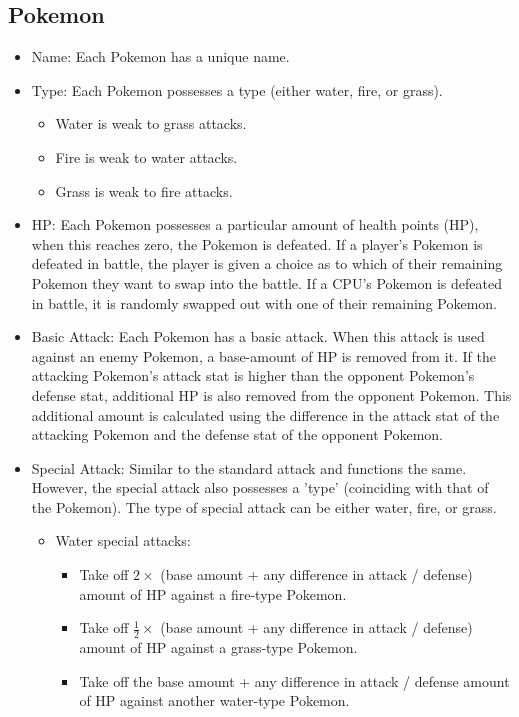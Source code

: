 \documentclass{article}
\begin{document}
  \subsection{Pokemon}
  \begin{itemize}
    \item Name: Each Pokemon has a unique name. 
    \item Type: Each Pokemon possesses a type (either water, fire, or grass).
      \begin{itemize}
        \item Water is weak to grass attacks. 
        \item Fire is weak to water attacks. 
        \item Grass is weak to fire attacks. 
      \end{itemize}
    \item HP: Each Pokemon possesses a particular amount of health points (HP), when this reaches zero, the Pokemon is defeated. If a player's Pokemon is defeated in battle, the player is given a choice as to which of their remaining Pokemon they want to swap into the battle. If a CPU's Pokemon is defeated in battle, it is randomly swapped out with one of their remaining Pokemon. 
    \item Basic Attack: Each Pokemon has a basic attack. When this attack is used against an enemy Pokemon, a base-amount of HP is removed from it. If the attacking Pokemon's attack stat is higher than the opponent Pokemon's defense stat, additional HP is also removed from the opponent Pokemon. This additional amount is calculated using the difference in the attack stat of the attacking Pokemon and the defense stat of the opponent Pokemon. 
    \item Special Attack: Similar to the standard attack and functions the same. However, the special attack also possesses a 'type' (coinciding with that of the Pokemon). The type of special attack can be either water, fire, or grass. 
      \begin{itemize}
        \item Water special attacks:
          \begin{itemize}
            \item Take off $2\times$ (base amount + any difference in attack / defense) amount of HP against a fire-type Pokemon.
            \item Take off $\frac{1}{2}\times{}$ (base amount + any difference in attack / defense) amount of HP against a grass-type Pokemon.
            \item Take off the base amount + any difference in attack / defense amount of HP against another water-type Pokemon.

\end{itemize}
\end{itemize}
\end{itemize}
\end{document}
